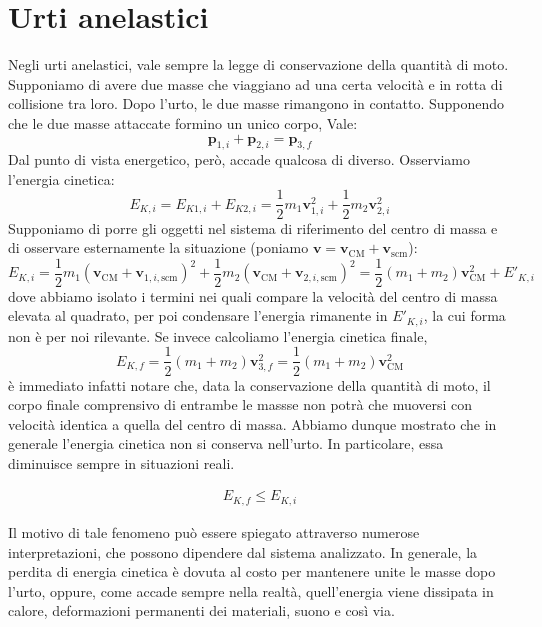 \section{Urti anelastici}
Negli urti anelastici, vale sempre la legge di conservazione della quantità
di moto. Supponiamo di avere due masse che viaggiano ad una certa velocità
e in rotta di collisione tra loro. Dopo l'urto, le due masse rimangono
in contatto. Supponendo che le due masse attaccate formino un unico corpo, Vale:
\[ \mathbf{p}_{1,i} + \mathbf{p}_{2,i} = \mathbf{p}_{3,f} \]
Dal punto di vista energetico, però, accade qualcosa di diverso. Osserviamo
l'energia cinetica:
\[ E_{K,i} = E_{K1, i} + E_{K2, i} = \frac12 m_1\mathbf{v}_{1,i}^2 + \frac12 m_2\mathbf{v}_{2,i}^2\]
Supponiamo di porre gli oggetti nel sistema di riferimento del centro di massa
e di osservare esternamente la situazione (poniamo $\mathbf{v} = \mathbf{v}_\text{CM} + \mathbf{v}_\text{scm}$):
\[ E_{K,i} = \frac12 m_1(\textbf{v}_\text{CM} + \mathbf{v}_{1,i,\text{scm}})^2 + \frac12 m_2(\textbf{v}_\text{CM} + \mathbf{v}_{2,i,\text{scm}})^2 = \frac12(m_1 + m_2)\mathbf{v}_\text{CM}^2 + E'_{K,i} \]
dove abbiamo isolato i termini nei quali compare la velocità del centro di massa
elevata al quadrato, per poi condensare l'energia rimanente in $E'_{K,i}$,
la cui forma non è per noi rilevante. Se invece calcoliamo l'energia cinetica
finale,
\[ E_{K,f} = \frac12 (m_1 + m_2)\mathbf{v}_{3,f}^2 = \frac12(m_1 + m_2)\mathbf{v}_\text{CM}^2 \]
è immediato infatti notare che, data la conservazione della quantità di moto,
il corpo finale comprensivo di entrambe le massse non potrà che muoversi
con velocità identica a quella del centro di massa.
Abbiamo dunque mostrato che in generale l'energia cinetica non si conserva nell'urto.
In particolare, essa diminuisce sempre in situazioni reali.

\begin{align}
    E_{K,f} \leq E_{K,i}
\end{align}

\noindent Il motivo di tale fenomeno può essere spiegato attraverso numerose
interpretazioni, che possono dipendere dal sistema analizzato. In generale,
la perdita di energia cinetica è dovuta al costo per mantenere unite le
masse dopo l'urto, oppure, come accade sempre nella realtà, quell'energia
viene dissipata in calore, deformazioni permanenti dei materiali, suono e
così via.